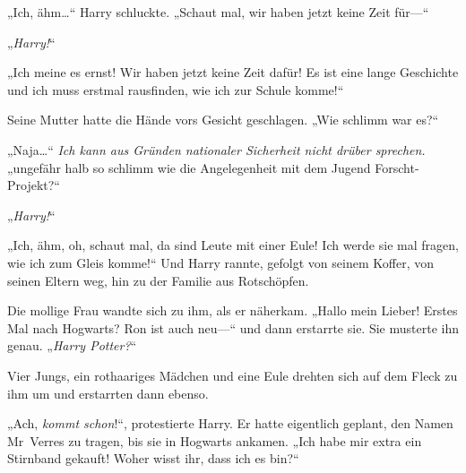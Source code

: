 „Ich, ähm…“ Harry schluckte. „Schaut mal, wir haben jetzt keine Zeit für—“

„\emph{Harry!}“

„Ich meine es ernst! Wir haben jetzt keine Zeit dafür! Es ist eine lange Geschichte und ich muss erstmal rausfinden, wie ich zur Schule komme!“

Seine Mutter hatte die Hände vors Gesicht geschlagen. „Wie schlimm war es?“

„Naja…“ \emph{Ich kann aus Gründen nationaler Sicherheit nicht drüber sprechen.} „ungefähr halb so schlimm wie die Angelegenheit mit dem Jugend Forscht-Projekt?“

„\emph{Harry!}“

„Ich, ähm, oh, schaut mal, da sind Leute mit einer Eule! Ich werde sie mal fragen, wie ich zum Gleis komme!“ Und Harry rannte, gefolgt von seinem Koffer, von seinen Eltern weg, hin zu der Familie aus Rotschöpfen.

Die mollige Frau wandte sich zu ihm, als er näherkam. „Hallo mein Lieber! Erstes Mal nach Hogwarts? Ron ist auch neu—“ und dann erstarrte sie. Sie musterte ihn genau. „\emph{Harry Potter?}“

Vier Jungs, ein rothaariges Mädchen und eine Eule drehten sich auf dem Fleck zu ihm um und erstarrten dann ebenso.

„Ach, \emph{kommt schon}!“, protestierte Harry. Er hatte eigentlich geplant, den Namen Mr~Verres zu tragen, bis sie in Hogwarts ankamen. „Ich habe mir extra ein Stirnband gekauft! Woher wisst ihr, dass ich es bin?“

